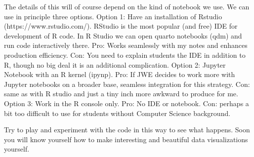 \documentclass[
  letterpaper,
]{scrbook}
\begin{document}
\begin{tcolorbox}[enhanced jigsaw, toprule=.15mm, colbacktitle=quarto-callout-caution-color!10!white, breakable, coltitle=black, rightrule=.15mm, bottomtitle=1mm, bottomrule=.15mm, titlerule=0mm, title=\textcolor{quarto-callout-caution-color}{\faFire}\hspace{0.5em}{Comment for Seitwerk}, arc=.35mm, leftrule=.75mm, toptitle=1mm, left=2mm, opacityback=0, opacitybacktitle=0.6, colframe=quarto-callout-caution-color-frame, colback=white]
The details of this will of course depend on the kind of notebook we
use. We can use in principle three options. Option 1: Have an
installation of Rstudio (https://www.rstudio.com/). RStudio is the most
popular (and free) IDE for development of R code. In R Studio we can
open quarto notebooks (qdm) and run code interactively there. Pro: Works
seamlessly with my notes and enhances production efficiency. Con: You
need to explain students the IDE in addition to R, though no big deal it
is an additional complication. Option 2: Jupyter Notebook with an R
kernel (ipynp). Pro: If JWE decides to work more with Jupyter notebooks
on a broader base, seamless integration for this strategy. Con: same as
with R studio and just a tiny inch more awkward to produce for me.
Option 3: Work in the R console only. Pro: No IDE or notebook. Con:
perhaps a bit too difficult to use for students without Computer Science
background.
\end{tcolorbox}

Try to play and experiment with the code in this way to see what
happens. Soon you will know yourself how to make interesting and
beautiful data visualizations yourself.
\end{document}
